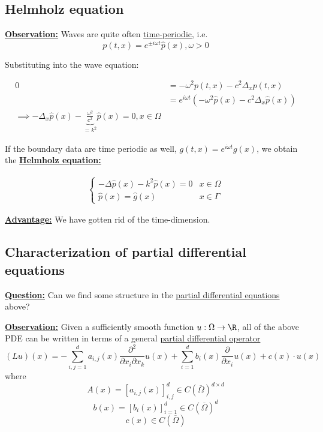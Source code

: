 \subsection{Helmholz equation}

\underline{\textbf{Observation:}} Waves are quite often \underline{time-periodic}, i.e.
\[p(t,x)=e^{\pm i\omega t}\hat{p}(x),\omega>0\]

Substituting into the wave equation:

\begin{align*}
    0&=-\omega^2 p(t,x)-c^2\Delta_x p(t,x)\\
    &= e^{i\omega t}\left(-\omega^2 \hat{p}(x)-c^2\Delta_x \hat{p}(x) \right)\\
    \implies -\Delta_x \hat{p}(x)-\underbrace{\frac{\omega^2}{c^2}}_{=k^2}\hat{p}(x)=0,x\in\Omega
\end{align*}

If the boundary data are time periodic as well, $g(t,x)=e^{i\omega t} g(x)$, we obtain the \underline{\textbf{Helmholz equation:}}

\begin{eqnarray}
    \begin{cases}
        -\Delta \hat{p}(x)-k^2\hat{p}(x)=0 & x\in \Omega\\
        \hat{p}(x)=\hat{g}(x) & x\in \Gamma
    \end{cases}
\end{eqnarray}

\underline{\textbf{Advantage:}} We have gotten rid of the time-dimension.

\subsection{Characterization of partial differential equations}

\underline{\textbf{Question:}} Can we find some structure in the \underline{partial differential equations} above?

\underline{\textbf{Observation:}} Given a sufficiently smooth function $u:\Omega\to\R$, all of the above PDE can be written in terms of a 
general \underline{partial differential operator}
\begin{equation}
    (Lu)(x)=-\sum_{i,j=1}^d a_{i,j}(x)\frac{\partial^2}{\partial x_i\partial x_k}u(x)+\sum_{i=1}^d b_i(x)\frac{\partial}{\partial x_i}u(x)+c(x)\cdot u(x)  
\end{equation}
where \[A(x)=[a_{i,j}(x)]_{i,j}^d\in C(\overline{\Omega})^{d\times d}\]
\[b(x)=[b_{i}(x)]_{i=1}^d\in C(\overline{\Omega})^{d}\]
\[c(x)\in C(\overline{\Omega})\]

